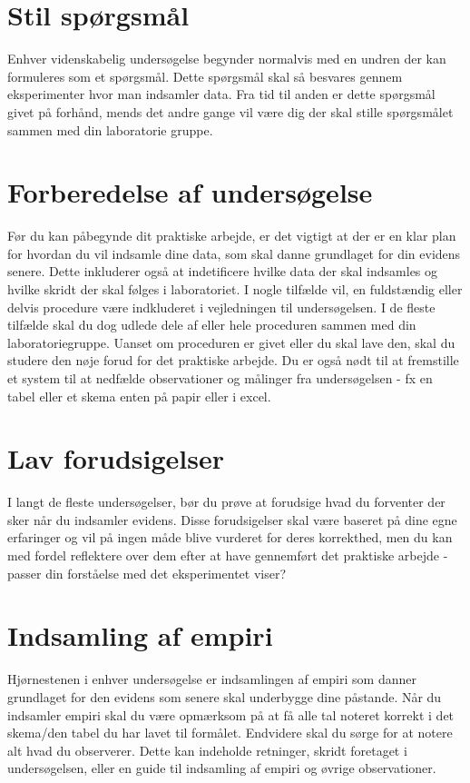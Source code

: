 \section{Stil spørgsmål}
\label{sec:SS}
Enhver videnskabelig undersøgelse begynder normalvis med en undren der kan formuleres som et spørgsmål. Dette spørgsmål skal så besvares gennem eksperimenter hvor man indsamler data. Fra tid til anden er dette spørgsmål givet på forhånd, mends det andre gange vil være dig der skal stille spørgsmålet sammen med din laboratorie gruppe.

\section{Forberedelse af undersøgelse}
 \label{sec:FaU}
 Før du kan påbegynde dit praktiske arbejde, er det vigtigt at der er en klar plan for hvordan du vil indsamle dine data, som skal danne grundlaget for din evidens senere. Dette inkluderer også at indetificere hvilke data der skal indsamles og hvilke skridt der skal følges i laboratoriet. I nogle tilfælde vil, en fuldstændig eller delvis procedure være indkluderet i vejledningen til undersøgelsen. I de fleste tilfælde skal du dog udlede dele af eller hele proceduren sammen med din laboratoriegruppe. Uanset om proceduren er givet eller du skal lave den, skal du studere den nøje forud for det praktiske arbejde. Du er også nødt til at fremstille et system til at nedfælde observationer og målinger fra undersøgelsen - fx en tabel eller et skema enten på papir eller i excel.
 
 \section{Lav forudsigelser}
 \label{sec:LF}
 I langt de fleste undersøgelser, bør du prøve at forudsige hvad du forventer der sker når du indsamler evidens. Disse forudsigelser skal være baseret på dine egne erfaringer og vil på ingen måde blive vurderet for deres korrekthed, men du kan med fordel reflektere over dem efter at have gennemført det praktiske arbejde - passer din forståelse med det eksperimentet viser?
 
 \section{Indsamling af empiri}
 \label{sec:IaE}
 Hjørnestenen i enhver undersøgelse er indsamlingen af empiri som danner grundlaget for den evidens som senere skal underbygge dine påstande. Når du indsamler empiri skal du være opmærksom på at få alle tal noteret korrekt i det skema/den tabel du har lavet til formålet. Endvidere skal du sørge for at notere alt hvad du observerer. Dette kan indeholde retninger, skridt foretaget i undersøgelsen, eller en guide til indsamling af empiri og øvrige observationer.
 
